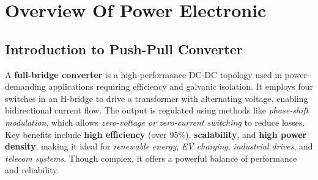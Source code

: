 \section{Overview Of Power Electronic}
\subsection{Introduction to Push-Pull Converter} 
A \textbf{full-bridge converter} is a high-performance DC-DC topology used in power-demanding applications requiring efficiency and galvanic isolation. It employs four switches in an H-bridge to drive a transformer with alternating voltage, enabling bidirectional current flow. The output is regulated using methods like \textit{phase-shift modulation}, which allows \textit{zero-voltage or zero-current switching} to reduce losses. Key benefits include \textbf{high efficiency} (over 95\%), \textbf{scalability}, and \textbf{high power density}, making it ideal for \textit{renewable energy}, \textit{EV charging}, \textit{industrial drives}, and \textit{telecom systems}. Though complex, it offers a powerful balance of performance and reliability.
